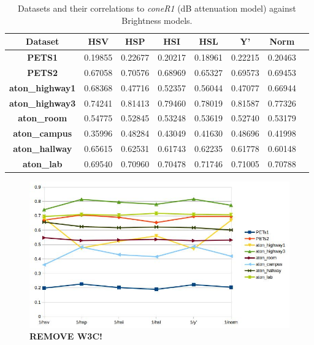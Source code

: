 \documentclass[12pt]{report}
\begin{document}
\begin{table}
\centering
\begin{tabular}{ |c|c|c|c|c|c|c|c| }
	\hline
	\textbf{Dataset} & \textbf{HSV} & \textbf{HSP} & \textbf{HSI} & \textbf{HSL}& \textbf{Y'} & \textbf{Norm} \\
	\hline
	\hline
	\textbf{PETS1} & 0.19855 & 0.22677 & 0.20217 & 0.18961 & 0.22215 & 0.20463 \\
	\hline
	\textbf{PETS2} & 0.67058 & 0.70576 & 0.68969 & 0.65327 & 0.69573 & 0.69453 \\
	\hline
	\textbf{aton\_highway1} & 0.68368 & 0.47716 & 0.52357 & 0.56044 & 0.47077 & 0.66944 \\
	\hline
	\textbf{aton\_highway3} & 0.74241 & 0.81413 & 0.79460 & 0.78019 & 0.81587 & 0.77326 \\
	\hline
	\textbf{aton\_room} & 0.54775 & 0.52845 & 0.53248 & 0.53619 & 0.52740 & 0.53179 \\
	\hline
	\textbf{aton\_campus} & 0.35996 & 0.48284 & 0.43049 & 0.41630 & 0.48696	 & 0.41998 \\
	\hline
	\textbf{aton\_hallway} & 0.65615 & 0.62531 & 0.61743 & 0.62235 & 0.61778 & 0.60148 \\
	\hline
	\textbf{aton\_lab} & 0.69540 & 0.70960 & 0.70478 & 0.71746 & 0.71005 & 0.70788 \\
	\hline
\end{tabular}
\caption{Datasets and their correlations to \textit{coneR1} (dB attenuation model) against Brightness models.}
\label{table:brightness_corr_db}
\end{table}

\begin{figure}
  \includegraphics[width=\linewidth]{figures/brightness/db/correlation_x.jpg}
  \caption{\textbf{REMOVE W3C!}}
\label{fig:brightness_corr_db}
\end{figure}
\end{document}
